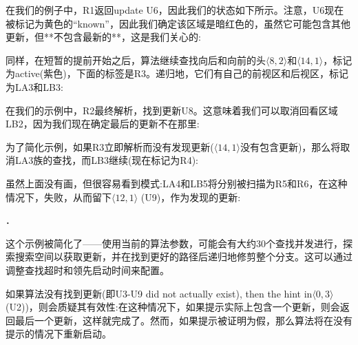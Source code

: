 在我们的例子中，R1返回update U6，因此我们的状态如下所示。注意，U6现在被标记为黄色的“known”，因此我们确定该区域是暗红色的，虽然它可能包含其他更新，但**不包含最新的**，这是我们关心的:


同样，在短暂的提前开始之后，算法继续查找向后和向前的头$\langle  8, 2 \rangle$和$\langle  14, 1 \rangle$，标记为active(紫色)，下面的标签是R3。递归地，它们有自己的前视区和后视区，标记为LA3和LB3:

在我们的示例中，R2最终解析，找到更新U8。这意味着我们可以取消回看区域LB2，因为我们现在确定最后的更新不在那里:


为了简化示例，如果R3立即解析而没有发现更新($\langle  14, 1 \rangle$没有包含更新)，那么将取消LA3族的查找，而LB3继续(现在标记为R4):


虽然上面没有画，但很容易看到模式:LA4和LB5将分别被扫描为R5和R6，在这种情况下，失败，从而留下$\langle  12, 1 \rangle$ (U9)，作为发现的更新:


．

这个示例被简化了——使用当前的算法参数，可能会有大约30个查找并发进行，探索搜索空间以获取更新，并在找到更好的路径后递归地修剪整个分支。这可以通过调整查找超时和领先启动时间来配置。

如果算法没有找到更新(即\if U3-U9 did not actually exist), then the hint in$\langle  0, 3 \rangle$ (U2))，则会质疑其有效性:在这种情况下，如果提示实际上包含一个更新，则会返回最后一个更新，这样就完成了。然而，如果提示被证明为假，那么算法将在没有提示的情况下重新启动。


% 


